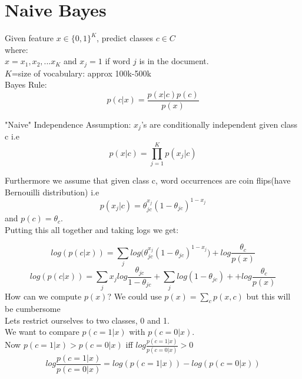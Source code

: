  \section{Naive Bayes}
 Given feature $ x \in \{0,1\}^{K}$, predict classes $c \in C$\\
 where:\\
 $x=x_{1},x_{2},...x_{K}$ and $x_{j}=1$ if word $j$ is in the document.\\ 
 $K$=size of vocabulary: approx 100k-500k\\

Bayes Rule:
\begin{equation}
p(c|x)=\frac{p(x|c)p(c)}{p(x)}
\end{equation}

"Naive" Independence Assumption: $x_{j}$'s are conditionally independent given class c i.e 
 \begin{equation}
 p(x|c)=\prod_{j=1}^{K}{ p(x_{j}|c)}
 \end{equation}
 
 Furthermore we assume that given class c, word occurrences are coin flips(have Bernouilli distribution) i.e
  \begin{equation}
  p(x_{j}|c)=\theta_{jc}^{x_{j}}(1-\theta_{jc})^{1-x_{j}}
  \end{equation}
 and $p(c)=\theta_{c}$.\\

 
 Putting this all together and taking logs we get:
 
 \begin{equation}
 log(p(c|x)) = \sum\limits_{j}log\big(\theta_{jc}^{x_{j}}(1-\theta_{jc})^{1-x_{j}}\big) + log \frac{\theta_{c}}{p(x)}
 \end{equation}
 \begin{equation}
 log(p(c|x)) = \sum\limits_{j}x_{j}log\frac{\theta_{jc}}{1-\theta_{jc}} +
 \sum\limits_{j} log(1-\theta_{jc}) + + log \frac{\theta_{c}}{p(x)}
 \end{equation}
 How can we compute $p(x)$? We could use $p(x)=\sum\limits_{c}p(x,c)$ but this will be cumbersome\\
 Lets restrict ourselves to two classes, 0 and 1.\\
We want to compare $p(c=1|x)$ with $p(c=0|x)$.\\
Now $p(c=1|x) > p(c=0|x)$ iff $log\frac{p(c=1|x)}{p(c=0|x)} >0$
 \begin{equation}
 log\frac{p(c=1|x)}{p(c=0|x)} = log(p(c=1|x))-log(p(c=0|x))
 \end{equation}
 
